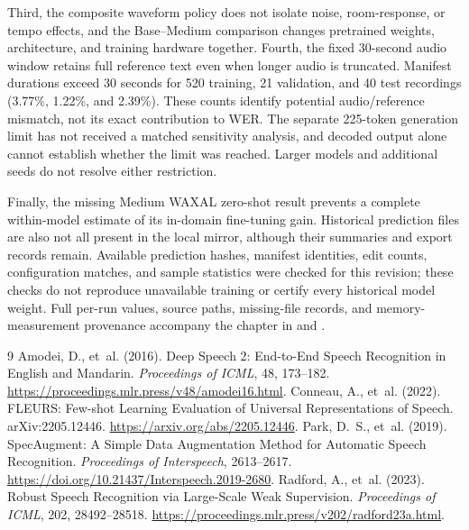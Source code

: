 \documentclass[12pt,a4paper]{report}
\begin{document}
Third, the composite waveform policy does not isolate noise, room-response,
or tempo effects, and the Base--Medium comparison changes pretrained weights,
architecture, and training hardware together. Fourth, the fixed 30-second
audio window retains full reference text even when longer audio is truncated.
Manifest durations exceed 30 seconds for 520 training, 21 validation, and
40 test recordings (3.77\%, 1.22\%, and 2.39\%). These counts identify
potential audio/reference mismatch, not its exact contribution to WER.
The separate 225-token generation limit has not received a matched sensitivity
analysis, and decoded output alone cannot establish whether the limit was
reached. Larger models and additional seeds do not resolve either restriction.

Finally, the missing Medium WAXAL zero-shot result prevents a complete
within-model estimate of its in-domain fine-tuning gain. Historical prediction
files are also not all present in the local mirror, although their summaries
and export records remain. Available prediction hashes, manifest identities,
edit counts, configuration matches, and sample statistics were checked for
this revision; these checks do not reproduce unavailable training or certify
every historical model weight. Full per-run values, source paths, missing-file
records, and memory-measurement provenance accompany the chapter in
 and .

\begin{thebibliography}{9}
Amodei, D., et~al. (2016). Deep Speech 2: End-to-End Speech Recognition in
English and Mandarin. \emph{Proceedings of ICML}, 48, 173--182.
\url{https://proceedings.mlr.press/v48/amodei16.html}.
Conneau, A., et~al. (2022). FLEURS: Few-shot Learning Evaluation of Universal
Representations of Speech. arXiv:2205.12446.
\url{https://arxiv.org/abs/2205.12446}.
Park, D.~S., et~al. (2019). SpecAugment: A Simple Data Augmentation Method
for Automatic Speech Recognition. \emph{Proceedings of Interspeech}, 2613--2617.
\url{https://doi.org/10.21437/Interspeech.2019-2680}.
Radford, A., et~al. (2023). Robust Speech Recognition via Large-Scale Weak
Supervision. \emph{Proceedings of ICML}, 202, 28492--28518.
\url{https://proceedings.mlr.press/v202/radford23a.html}.
\end{thebibliography}
\end{document}
